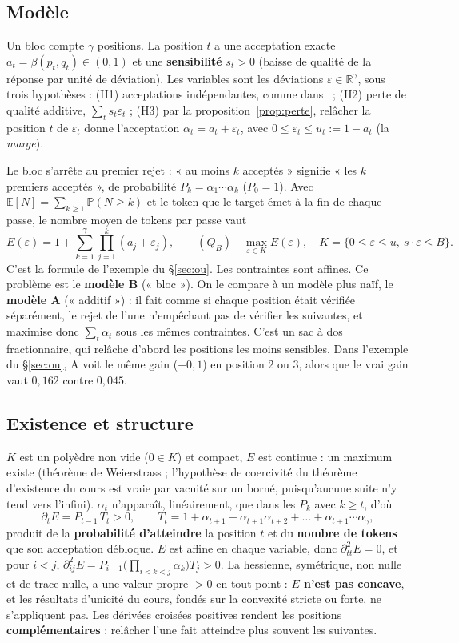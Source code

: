 \documentclass[11pt,a4paper]{article}
\newcommand{\R}{\mathbb{R}}
\newcommand{\Prob}{\mathbb{P}}
\newcommand{\Esp}{\mathbb{E}}
\theoremstyle{plain}
\begin{document}
\subsection{Modèle}\label{sec:modeleII}
Un bloc compte $\gamma$ positions. La position $t$ a une acceptation exacte $a_t=\beta(p_t,q_t)\in(0,1)$ et une \textbf{sensibilité} $s_t>0$ (baisse de qualité de la réponse par unité de déviation). Les variables sont les déviations $\varepsilon\in\R^\gamma$, sous trois hypothèses : (H1) acceptations indépendantes, comme dans~\cite{leviathan} ; (H2) perte de qualité additive, $\sum_ts_t\varepsilon_t$ ; (H3) par la proposition~\ref{prop:perte}, relâcher la position $t$ de $\varepsilon_t$ donne l'acceptation $\alpha_t=a_t+\varepsilon_t$, avec $0\le\varepsilon_t\le u_t:=1-a_t$ (la \emph{marge}).

Le bloc s'arrête au premier rejet : « au moins $k$ acceptés » signifie « les $k$ premiers acceptés », de probabilité $P_k=\alpha_1\cdots\alpha_k$ ($P_0=1$). Avec $\Esp[N]=\sum_{k\ge1}\Prob(N\ge k)$ et le token que le target émet à la fin de chaque passe, le nombre moyen de tokens par passe vaut
\[E(\varepsilon)=1+\sum_{k=1}^{\gamma}\prod_{j=1}^{k}(a_j+\varepsilon_j),\qquad (Q_B)\quad \max_{\varepsilon\in K}E(\varepsilon),\quad K=\{0\le\varepsilon\le u,\ s\cdot\varepsilon\le B\}.\]
C'est la formule de l'exemple du §\ref{sec:ou}. Les contraintes sont affines. Ce problème est le \textbf{modèle B} (« bloc »). On le compare à un modèle plus naïf, le \textbf{modèle A} (« additif ») : il fait comme si chaque position était vérifiée séparément, le rejet de l'une n'empêchant pas de vérifier les suivantes, et maximise donc $\sum_t\alpha_t$ sous les mêmes contraintes. C'est un sac à dos fractionnaire, qui relâche d'abord les positions les moins sensibles. Dans l'exemple du §\ref{sec:ou}, A voit le même gain ($+0{,}1$) en position 2 ou 3, alors que le vrai gain vaut $0{,}162$ contre $0{,}045$.

\subsection{Existence et structure}\label{sec:existenceII}
$K$ est un polyèdre non vide ($0\in K$) et compact, $E$ est continue : un maximum existe (théorème de Weierstrass ; l'hypothèse de coercivité du théorème d'existence du cours est vraie par vacuité sur un borné, puisqu'aucune suite n'y tend vers l'infini).
$\alpha_t$ n'apparaît, linéairement, que dans les $P_k$ avec $k\ge t$, d'où
\[\partial_tE=P_{t-1}\,T_t>0,\qquad T_t=1+\alpha_{t+1}+\alpha_{t+1}\alpha_{t+2}+\dots+\alpha_{t+1}\cdots\alpha_\gamma,\]
produit de la \textbf{probabilité d'atteindre} la position $t$ et du \textbf{nombre de tokens} que son acceptation débloque.
$E$ est affine en chaque variable, donc $\partial^2_{tt}E=0$, et pour $i<j$, $\partial^2_{ij}E=P_{i-1}\big(\prod_{i<k<j}\alpha_k\big)T_j>0$. La hessienne, symétrique, non nulle et de trace nulle, a une valeur propre $>0$ en tout point : \textbf{$E$ n'est pas concave}, et les résultats d'unicité du cours, fondés sur la convexité stricte ou forte, ne s'appliquent pas. Les dérivées croisées positives rendent les positions \textbf{complémentaires} : relâcher l'une fait atteindre plus souvent les suivantes.
\end{document}
